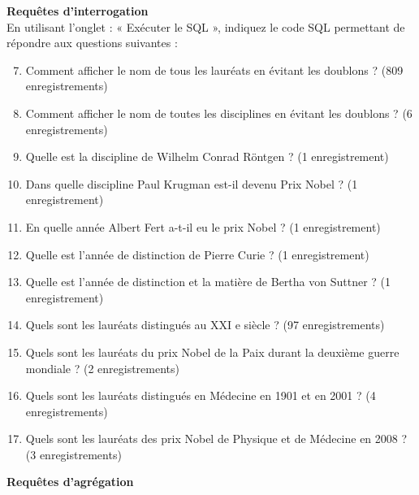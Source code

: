 \documentclass[10pt,cours,a4paper,firamath]{nsi}
\begin{document}
\begin{exercice}
    \textbf{Requêtes d'interrogation}\\
    
    En utilisant l'onglet : « Exécuter le SQL », indiquez le code SQL permettant de répondre aux questions suivantes :\\
    
    \begin{enumerate}
        \setcounter{enumi}{6}
        \item  Comment afficher le nom de tous les lauréats en évitant les doublons ? (809 enregistrements)
        \item Comment afficher le nom de toutes les disciplines en évitant les doublons ? (6 enregistrements)
        \item  Quelle est la discipline de Wilhelm Conrad Röntgen ? (1 enregistrement)
        \item  Dans quelle discipline Paul Krugman est-il devenu Prix Nobel ? (1 enregistrement)
        \item  En quelle année Albert Fert a-t-il eu le prix Nobel ? (1 enregistrement)
        \item  Quelle est l'année de distinction de Pierre Curie ? (1 enregistrement)
        \item  Quelle est l'année de distinction et la matière de Bertha von Suttner ? (1 enregistrement)
        \item  Quels sont les lauréats distingués au XXI e siècle ? (97 enregistrements)
        \item  Quels sont les lauréats du prix Nobel de la Paix durant la deuxième guerre mondiale ? (2 enregistrements)
        \item  Quels sont les lauréats distingués en Médecine en 1901 et en 2001 ? (4 enregistrements)
        \item  Quels sont les lauréats des prix Nobel de Physique et de Médecine en 2008 ? (3 enregistrements)	\\
    \end{enumerate}
    
    \textbf{Requêtes d'agrégation}\\
    

\end{exercice}
\end{document}
